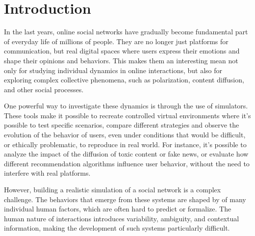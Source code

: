 \section{Introduction}
\label{sec:introduction}

In the last years, online social networks have gradually become fundamental part of everyday life of millions of people.
They are no longer just platforms for communication, but real digital spaces where users express their emotions and shape their opinions and behaviors.
This makes them an interesting mean not only for studying individual dynamics in online interactions, but also for exploring complex collective phenomena, such as polarization, content diffusion, and other social processes.

One powerful way to investigate these dynamics is through the use of simulators.
These tools make it possible to recreate controlled virtual environments where it's possible to test specific scenarios, compare different strategies and observe the evolution of the behavior of users, even under conditions that would be difficult, or ethically problematic, to reproduce in real world.
For instance, it's possible to analyze the impact of the diffusion of toxic content or fake news, or evaluate how different recommendation algorithms influence user behavior, without the need to interfere with real platforms.

However, building a realistic simulation of a social network is a complex challenge.
The behaviors that emerge from these systems are shaped by of many individual human factors, which are often hard to predict or formalize.
The human nature of interactions introduces variability, ambiguity, and contextual information, making the development of such systems particularly difficult.





